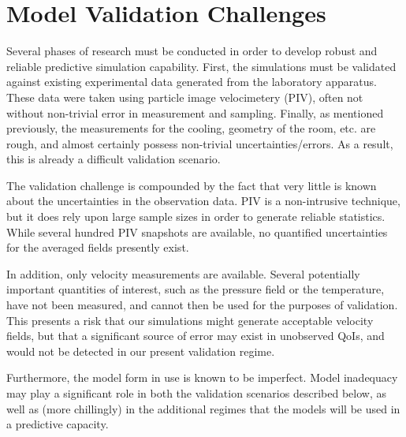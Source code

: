 \documentclass{article}
\begin{document}
%
%
\section{Model Validation Challenges}


Several phases of research must be conducted in order to develop robust
and reliable predictive simulation capability. First, the simulations
must be validated against existing experimental data generated from the
laboratory apparatus. These data were taken using particle image
velocimetery (PIV), often not without non-trivial error in measurement and
sampling. Finally, as mentioned previously, the measurements for the
cooling, geometry of the room, etc. are rough, and almost certainly
possess non-trivial uncertainties/errors. As a result, this is already a
difficult validation scenario. 

The validation challenge is compounded by the fact that very little is
known about the uncertainties in the observation data. PIV is a
non-intrusive technique, but it does rely upon large sample sizes in
order to generate reliable statistics. While several hundred PIV
snapshots are available, no quantified uncertainties for the averaged fields
presently exist.  

In addition, only velocity measurements are available. Several
potentially important quantities of interest, such as the pressure field
or the temperature, have not been measured, and cannot then be used for
the purposes of validation. This presents a risk that our 
simulations might generate acceptable velocity fields, but that a
significant source of error may exist in unobserved QoIs, and would not
be detected in our present validation regime. 

Furthermore, the model form in use is known to be imperfect. 
Model inadequacy may play a significant role in both the validation
scenarios described below, as well as (more chillingly) in the
additional regimes that the models will be used in a predictive
capacity. 

%
%
\end{document}
